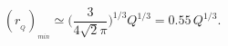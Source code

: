\begin{equation}
(r_{_{Q}})_{_{min}} \simeq \biggl({\frac{3}{4\sqrt{2}\pi}}\biggr)
^{1/3}Q^{1/3}= 0.55 \,Q^{1/3}.  \label{rq}
\end{equation}

